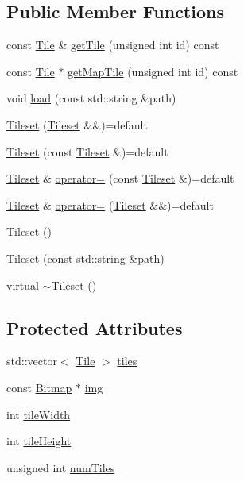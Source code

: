\subsection*{Public Member Functions}
\begin{DoxyCompactItemize}
\item 
const \hyperlink{classZeta_1_1Tile}{Tile} \& \hyperlink{classZeta_1_1Tileset_af349a0e0ad0184f2ac718ab47f2513eb}{get\+Tile} (unsigned int id) const 
\item 
const \hyperlink{classZeta_1_1Tile}{Tile} $\ast$ \hyperlink{classZeta_1_1Tileset_adfbc014ed18d2558953302b6eaede783}{get\+Map\+Tile} (unsigned int id) const 
\item 
void \hyperlink{classZeta_1_1Tileset_a2236e4c111d25de13ffbb581684a1f8a}{load} (const std\+::string \&path)
\item 
\hyperlink{classZeta_1_1Tileset_ab0a91f588dc2e7ffef4a4a7bc9c6a829}{Tileset} (\hyperlink{classZeta_1_1Tileset}{Tileset} \&\&)=default
\item 
\hyperlink{classZeta_1_1Tileset_a73e10e2d3c692b13fc37caac4e717f5f}{Tileset} (const \hyperlink{classZeta_1_1Tileset}{Tileset} \&)=default
\item 
\hyperlink{classZeta_1_1Tileset}{Tileset} \& \hyperlink{classZeta_1_1Tileset_a82155644fa91d8ab457529ddbd8f644c}{operator=} (const \hyperlink{classZeta_1_1Tileset}{Tileset} \&)=default
\item 
\hyperlink{classZeta_1_1Tileset}{Tileset} \& \hyperlink{classZeta_1_1Tileset_aad61e5ad55ff57078283055003aa0e00}{operator=} (\hyperlink{classZeta_1_1Tileset}{Tileset} \&\&)=default
\item 
\hyperlink{classZeta_1_1Tileset_a8d20f06870c3a62e03f0bd76c36977ee}{Tileset} ()
\item 
\hyperlink{classZeta_1_1Tileset_abeb5e3b16c3cf2c35ffaf6f07d236ef4}{Tileset} (const std\+::string \&path)
\item 
virtual \hyperlink{classZeta_1_1Tileset_ad32098815ac32879cdc6d560fec13bbb}{$\sim$\+Tileset} ()
\end{DoxyCompactItemize}
\subsection*{Protected Attributes}
\begin{DoxyCompactItemize}
\item 
std\+::vector$<$ \hyperlink{classZeta_1_1Tile}{Tile} $>$ \hyperlink{classZeta_1_1Tileset_adc7b8608cb43ca104c1f93254d5f59f3}{tiles}
\item 
const \hyperlink{classZeta_1_1Bitmap}{Bitmap} $\ast$ \hyperlink{classZeta_1_1Tileset_a489e70507ae6d8b72fb9fe0f902d6f09}{img}
\item 
int \hyperlink{classZeta_1_1Tileset_a1ea0b39b40b488f44813f854d55914be}{tile\+Width}
\item 
int \hyperlink{classZeta_1_1Tileset_a5de00da0d0b2ac5b6fe03b1a4a024867}{tile\+Height}
\item 
unsigned int \hyperlink{classZeta_1_1Tileset_a3f4b2bd8dd2232ddd13f36f0fd6c45e5}{num\+Tiles}
\end{DoxyCompactItemize}


